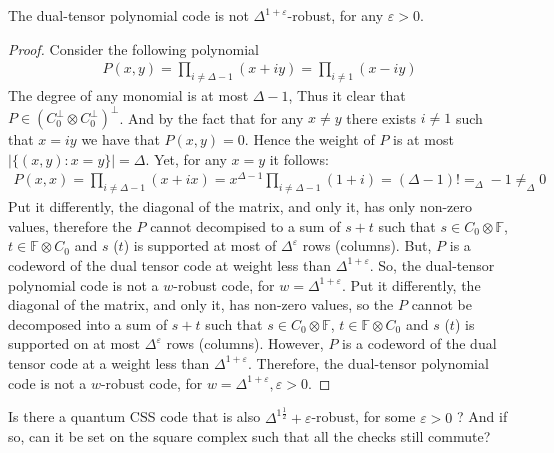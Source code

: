 \begin{claim}
  \label{claim:nowr} The dual-tensor polynomial code is not $\Delta^{1 +\varepsilon}$-robust, for any $\varepsilon > 0$.  
\end{claim}

\begin{proof}
Consider the following polynomial 
  \begin{equation*}
    \begin{split}
      P(x,y) = \prod_{i \neq \Delta - 1}{ \left( x + i y \right)  }=\prod_{i \neq  1}{ \left( x - i y \right)  }  
         \end{split}
  \end{equation*}
  The degree of any monomial is at most $\Delta-1$, Thus it clear that $P \in \left( C_{0}^{\perp} \otimes C_{0}^{\perp} \right)^{\perp}$. And by the fact that for any $x \neq y$ there exists $i\neq 1 $ such that $x = iy$ we have that $P(x,y) = 0$. Hence the weight of $P$ is at most $|\{ (x,y) : x = y \}|= \Delta$. Yet, for any $x = y$ it follows:      
  \begin{equation*}
    \begin{split}
       P(x,x) = \prod_{i \neq \Delta - 1}{ \left( x + i x \right)  }= x^{\Delta-1}\prod_{i \neq \Delta - 1}{ \left( 1 + i \right) } = \left( \Delta-1 \right)!  =_{\Delta} -1  \neq_{\Delta} 0 
    \end{split}
  \end{equation*}
  Put it differently, the diagonal of the matrix, and only it, has only non-zero values, therefore the $P$ cannot decompised to a sum of $s + t$ such that $s \in C_{0}\otimes \mathbb{F}$, $t \in \mathbb{F}\otimes C_{0}$ and $s$ ($t$) is supported at most of $\Delta^{\varepsilon}$ rows (columns). But, $P$ is a codeword of the dual tensor code at weight less than $\Delta^{1 + \varepsilon}$. So, the dual-tensor polynomial code is not a $w$-robust code,  for $w = \Delta^{1 +\varepsilon}$.   
  Put it differently, the diagonal of the matrix, and only it, has non-zero values, so the $P$ cannot be decomposed into a sum of $s + t$ such that $s \in C_{0}\otimes \mathbb{F}$, $t \in \mathbb{F}\otimes C_{0}$ and $s$ ($t$) is supported on at most $\Delta^{\varepsilon}$ rows (columns). However, $P$ is a codeword of the dual tensor code at a weight less than $\Delta^{1 + \varepsilon}$. Therefore, the dual-tensor polynomial code is not a $w$-robust code, for $w = \Delta^{1 +\varepsilon}, \varepsilon> 0 $.
\end{proof}

\begin{openproblem} 
Is there a quantum CSS code that is also $\Delta^{1\frac{1}{2}}+ \varepsilon$-robust, for some $\varepsilon > 0$ ? And if so, can it be set on the square complex such that all the checks still commute?
\end{openproblem}


